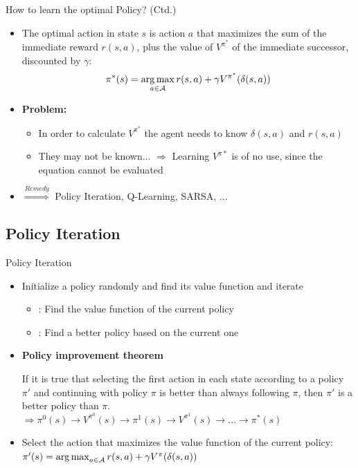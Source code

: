 \begin{frame}{How to learn the optimal Policy? (Ctd.)}{}
	\begin{itemize}
		\item The optimal action in state $s$ is action $a$ that maximizes the sum of the immediate reward $r(s, a)$,
			plus the value of $V^{\pi^*}$ of the immediate successor, discounted by $\gamma$:
		\begin{equation}
			\pi^*(s) = \operatorname*{arg\,max}_{a \in \mathcal{A}} r(s, a) + \gamma V^{\pi^*}(\delta(s, a))
		\end{equation}
		\item \textbf{Problem:}
		\begin{itemize}
			\item In order to calculate $V^{\pi^*}$ the agent needs to know $\delta(s, a)$ and $r(s, a)$
			\item They may not be known... $\Rightarrow$ Learning $V^{\pi*}$ is of no use,
				since the equation cannot be evaluated
		\end{itemize}
		\item $\overset{Remedy}{\Longrightarrow}$ Policy Iteration, Q-Learning, SARSA, ...
	\end{itemize}
\end{frame}


\subsection{Policy Iteration}

\begin{frame}{Policy Iteration}{}
	\begin{itemize}
		\item Initialize a policy randomly and find its value function and iterate
		\begin{itemize}
			\item {}: Find the value function of the current policy
			\item {}: Find a better policy based on the current one
		\end{itemize}
		\item \textbf{Policy improvement theorem}
		\begin{boxBlue}
			\footnotesize
			If it is true that selecting the first action in each state according to a policy $\pi'$ and continuing
			with policy $\pi$ is better than always following $\pi$, then $\pi'$ is a better policy than $\pi$. $\Rightarrow
			\pi^0(s) \longrightarrow V^{\pi^0}(s) \longrightarrow \pi^1(s) \longrightarrow V^{\pi^1}(s)
			\longrightarrow \dots \longrightarrow \pi^*(s)$
		\end{boxBlue}
		\item Select the action that maximizes the value function of the current policy:
		$\pi'(s) = \operatorname*{arg\,max}_{a \in \mathcal{A}} r(s, a) + \gamma V^{\pi}(\delta(s, a))$
	\end{itemize}
\end{frame}


